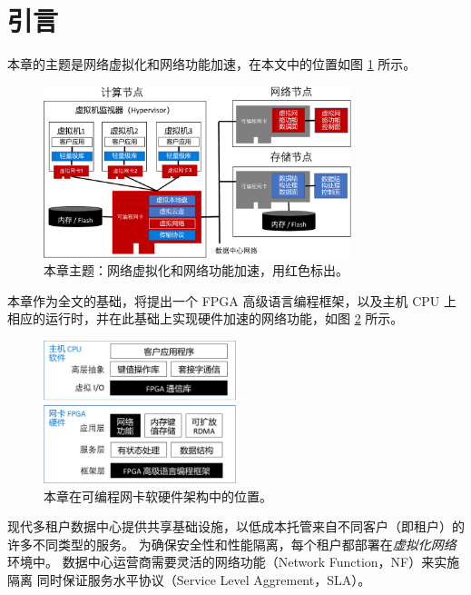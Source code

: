 \section{引言}

本章的主题是网络虚拟化和网络功能加速，在本文中的位置如图 \ref{clicknp:fig:sys-arch} 所示。

\begin{figure}[htbp]
	\centering
	\includegraphics[width=0.8\textwidth]{image/sys_arch.pdf}
	\caption{本章主题：网络虚拟化和网络功能加速，用红色标出。}
	\label{clicknp:fig:sys-arch}
\end{figure}

本章作为全文的基础，将提出一个 FPGA 高级语言编程框架，以及主机 CPU 上相应的运行时，并在此基础上实现硬件加速的网络功能，如图 \ref{clicknp:fig:sw-hw-codesign} 所示。

\begin{figure}[htbp]
	\centering
	\includegraphics[width=0.5\textwidth]{image/sw_hw_codesign.pdf}
	\caption{本章在可编程网卡软硬件架构中的位置。}
	\label{clicknp:fig:sw-hw-codesign}
\end{figure}

现代多租户数据中心提供共享基础设施，以低成本托管来自不同客户（即租户）的许多不同类型的服务。
为确保安全性和性能隔离，每个租户都部署在\textit{虚拟化网络}环境中。
数据中心运营商需要灵活的网络功能（Network Function，NF）来实施隔离
同时保证服务水平协议（Service Level Aggrement，SLA）。

